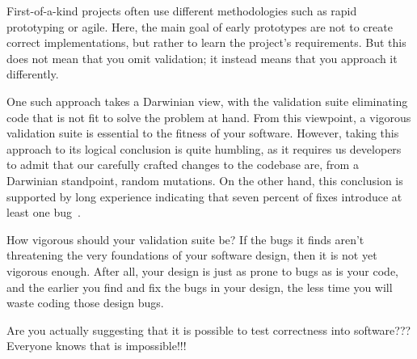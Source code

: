 First-of-a-kind projects often use different methodologies such as
rapid prototyping or agile.
Here, the main goal of early prototypes are not to create correct
implementations, but rather to learn the project's requirements.
But this does not mean that you omit validation; it instead means that
you approach it differently.

One such approach takes a Darwinian view, with the validation suite
eliminating code that is not fit to solve the problem at hand.
From this viewpoint, a vigorous validation suite is essential to the
fitness of your software.
However, taking this approach to its logical conclusion is quite humbling,
as it requires us developers to admit that our carefully crafted changes
to the codebase are, from a Darwinian standpoint, random mutations.
On the other hand, this conclusion is supported by long experience
indicating that seven percent of fixes introduce at least one
bug~\cite{RexBlack2012SQA}.

How vigorous should your validation suite be?
If the bugs it finds aren't threatening the very foundations of your
software design, then it is not yet vigorous enough.
After all, your design is just as prone to bugs as is your code, and
the earlier you find and fix the bugs in your design, the less time
you will waste coding those design bugs.

\QuickQuiz{}
	Are you actually suggesting that it is possible to test
	correctness into software???
	Everyone knows that is impossible!!!
 \QuickQuizEnd

